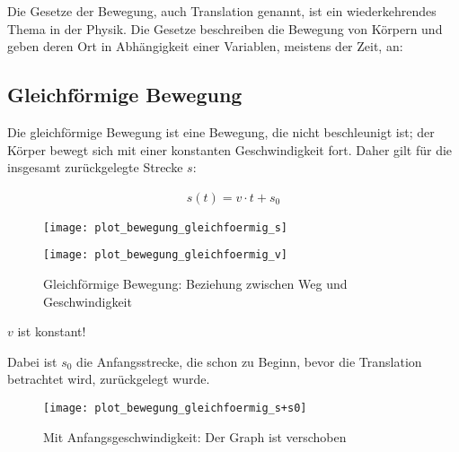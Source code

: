 Die Gesetze der Bewegung, auch Translation genannt, ist ein wiederkehrendes Thema in der Physik. Die Gesetze beschreiben die Bewegung von Körpern und geben deren Ort in Abhängigkeit einer Variablen, meistens der Zeit, an:

\subsection{Gleichförmige Bewegung} \label{subsec:gleichfoermig}

Die gleichförmige Bewegung ist eine Bewegung, die nicht beschleunigt ist; der Körper bewegt sich mit einer konstanten Geschwindigkeit fort. Daher gilt für die insgesamt zurückgelegte Strecke $s$:

\begin{align} \label{eq:gleichfoermig}
	s(t) = v \cdot t + s_0
\end{align}

\begin{figure}[h!]
	\centering
	\begin{minipage}[b]{0.45\linewidth}
		\begin{comment} Gnuplot:
set xlabel "t"
set ylabel "s(t)"
set output "plot_bewegung_gleichfoermig_s.png"
plot s(x) = 1x ls 1
		\end{comment}
    	\texttt{[image: plot\_bewegung\_gleichfoermig\_s]}
	\end{minipage}
	\begin{minipage}[b]{0.45\linewidth}
		\begin{comment} Gnuplot:
set xlabel "t"
set ylabel "v(t)"
set output "plot_bewegung_gleichfoermig_v.png"
plot 1 ls 1
		\end{comment}
    	\texttt{[image: plot\_bewegung\_gleichfoermig\_v]}
	\end{minipage}
	\caption{Gleichförmige Bewegung: Beziehung zwischen Weg und Geschwindigkeit}
	\label{fig:gleichfoermig}
\end{figure}


\begin{Wichtig}
$v$ ist konstant!
\end{Wichtig}

\noindent Dabei ist $s_0$ die Anfangsstrecke, die schon zu Beginn, bevor die Translation betrachtet wird, zurückgelegt wurde.

\begin{figure}[h!]
	\centering
	\begin{comment} Gnuplot:
set xlabel "t"
set ylabel "s(t)+s_0"
set output "plot_bewegung_gleichfoermig_s+s0.png"
plot s(x) = 1x+1 ls 1
	\end{comment}
	\texttt{[image: plot\_bewegung\_gleichfoermig\_s+s0]}
	\caption{Mit Anfangsgeschwindigkeit: Der Graph ist verschoben}
\end{figure}

